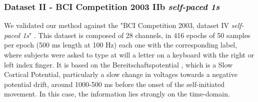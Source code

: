 \documentclass[nouppercase]{ifmbe}
\begin{document}




   


\subsubsection{Dataset II - BCI Competition 2003 IIb \textit{self-paced 1s}}
We validated our method against the "BCI Competition 2003, dataset IV \textit{self-paced 1s}" \cite{c51}. This dataset is composed of 28 channels, in 416 epochs of 50 samples per epoch (500 ms length at 100 Hz) each one with the corresponding label, where subjects were asked to type at will a letter on a keyboard with the right or left index finger.  It is based on the Bereitschaftspotential \cite{c52}, which is a Slow Cortical Potential, particularly a slow change in voltages towards a negative potential drift, around 1000-500 ms before the onset of the self-initiated movement.  In this case, the information lies strongly on the time-domain.
\end{document}
